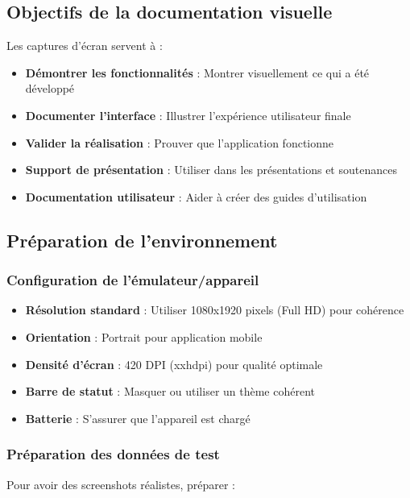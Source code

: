 \documentclass[a4paper,11pt]{report}
\begin{document}
\subsection{Objectifs de la documentation visuelle}

Les captures d'écran servent à :
\begin{itemize}
    \item \textbf{Démontrer les fonctionnalités} : Montrer visuellement ce qui a été développé
    \item \textbf{Documenter l'interface} : Illustrer l'expérience utilisateur finale
    \item \textbf{Valider la réalisation} : Prouver que l'application fonctionne
    \item \textbf{Support de présentation} : Utiliser dans les présentations et soutenances
    \item \textbf{Documentation utilisateur} : Aider à créer des guides d'utilisation
\end{itemize}

\subsection{Préparation de l'environnement}

\subsubsection{Configuration de l'émulateur/appareil}

\begin{itemize}
    \item \textbf{Résolution standard} : Utiliser 1080x1920 pixels (Full HD) pour cohérence
    \item \textbf{Orientation} : Portrait pour application mobile
    \item \textbf{Densité d'écran} : 420 DPI (xxhdpi) pour qualité optimale
    \item \textbf{Barre de statut} : Masquer ou utiliser un thème cohérent
    \item \textbf{Batterie} : S'assurer que l'appareil est chargé
\end{itemize}

\subsubsection{Préparation des données de test}

Pour avoir des screenshots réalistes, préparer :
\end{document}
